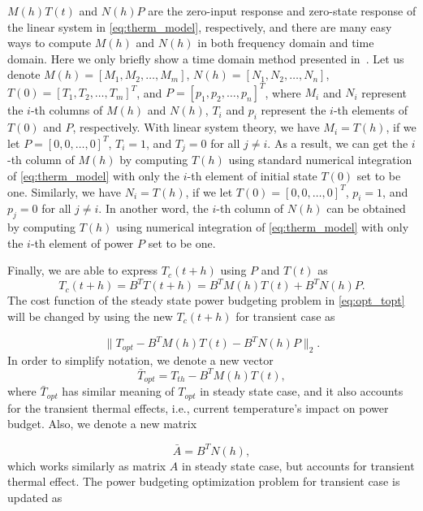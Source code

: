 $M(h)T(t)$ and $N(h)P$ are the zero-input response and zero-state response of the
linear system in \eqref{eq:therm_model}, respectively, and there are many
easy ways to compute $M(h)$ and $N(h)$ in both frequency domain and
time domain. Here we only briefly show a time domain method presented
in~\cite{Han:JLPE'07}. 
Let us denote $M(h)=[M_1, M_2, \ldots, M_m]$, $N(h)=[N_1, N_2, \ldots, N_n]$,
$T(0)=[T_1, T_2, \ldots, T_m]^T$, and $P=[p_1, p_2, \ldots, p_n]^T$,
where $M_i$ and $N_i$ represent the $i$-th columns of $M(h)$ and $N(h)$,
$T_i$ and $p_i$ represent the $i$-th elements of $T(0)$ and $P$,
respectively. With linear system theory, we have $M_i=T(h)$, if we let $P=[0,0,\ldots,0]^{T}$, $T_i=1$, and
$T_j=0$ for all $j\neq i$. As a result, we can get the $i$-th column of
$M(h)$ by computing $T(h)$ using standard numerical integration of \eqref{eq:therm_model} with only the $i$-th
element of initial state $T(0)$ set to be one. Similarly, we have
$N_i=T(h)$, if we let $T(0)=[0,0,\ldots,0]^T$, $p_i=1$, and $p_j=0$ for all $j\neq
i$. In another word, the $i$-th column of
$N(h)$ can be obtained by computing $T(h)$ using numerical integration of
\eqref{eq:therm_model} with only the $i$-th
element of power $P$ set to be one.

Finally, we are able to express $T_c(t+h)$ using $P$ and $T(t)$ as
\begin{equation}
T_c(t+h) = B^{T}T(t+h)= B^{T}M(h)T(t)+B^{T}N(h)P.
\end{equation}
The cost function of the steady state power budgeting problem in
\eqref{eq:opt_topt} will be changed by using the new $T_c(t+h)$ for
transient case as

\begin{equation}\label{eq:cost_trans}
\|T_{opt} - B^{T}M(h)T(t) - B^{T}N(h)P \|_2.
\end{equation}
In order to simplify notation, we denote a new vector  
\begin{equation}
\bar{T}_{opt}=T_{th} - B^{T}M(h)T(t),
\end{equation}
where $\bar{T}_{opt}$ has similar meaning of
$T_{opt}$ in steady state case, and it also accounts for the transient
thermal effects, i.e., current temperature's impact on power
budget. Also, we denote a new matrix 

\begin{equation}
\bar{A} = B^{T}N(h), 
\end{equation}
which works similarly as matrix $A$ in steady
state case, but accounts for transient thermal effect. The power
budgeting optimization problem for transient case is updated as 




